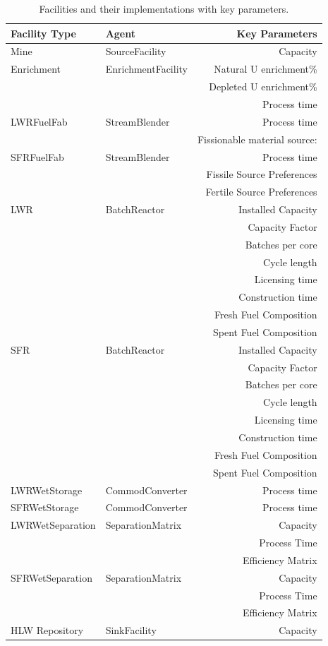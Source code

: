 \onecolumn
\begin{table}
\centering
\begin{tabular}{|l|l|r|}
\hline
\textbf{Facility Type} &\textbf{Agent} & \textbf{Key Parameters}\\
\hline
Mine & SourceFacility & Capacity\\
\hline
Enrichment & EnrichmentFacility & Natural U enrichment\% \\
& & Depleted U enrichment\% \\
& & Process time \\
\hline
LWRFuelFab & StreamBlender & Process time\\
& & Fissionable material source:\\
\hline
SFRFuelFab & StreamBlender  & Process time\\
& & Fissile Source Preferences\\
& & Fertile Source Preferences\\
\hline
LWR & BatchReactor & Installed Capacity \\
& & Capacity Factor \\
& & Batches per core \\ 
& & Cycle length\\
& & Licensing time\\
& & Construction time\\
& & Fresh Fuel Composition \\
& & Spent Fuel Composition \\
\hline
SFR & BatchReactor & Installed Capacity\\
& & Capacity Factor \\
& & Batches per core \\ 
& & Cycle length\\
& & Licensing time\\
& & Construction time\\
& & Fresh Fuel Composition \\
& & Spent Fuel Composition \\
\hline
LWRWetStorage & CommodConverter & Process time\\
\hline
SFRWetStorage & CommodConverter & Process time\\
\hline
LWRWetSeparation & SeparationMatrix & Capacity\\
& & Process Time\\
& & Efficiency Matrix\\
\hline
SFRWetSeparation & SeparationMatrix & Capacity\\
& & Process Time\\
& & Efficiency Matrix\\
\hline
HLW Repository & SinkFacility & Capacity \\
\hline
\end{tabular}
\caption{Facilities and their implementations with key parameters.}
\label{tab:facimpl}
\end{table}
\twocolumn


